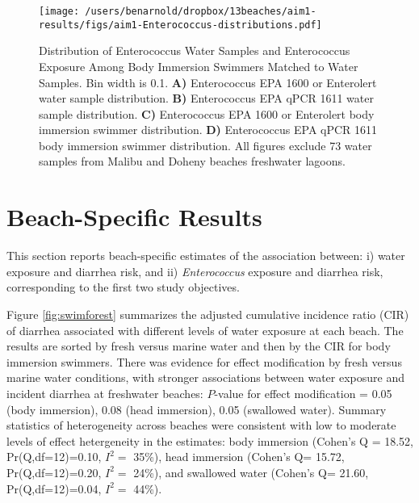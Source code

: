 \documentclass[12pt]{article}\usepackage[]{graphicx}\usepackage[]{color}
\begin{document}
\begin{figure}
\begin{center}
\texttt{[image: /users/benarnold/dropbox/13beaches/aim1-results/figs/aim1-Enterococcus-distributions.pdf]}
\caption{Distribution of Enterococcus Water Samples and Enterococcus Exposure Among Body Immersion Swimmers Matched to Water Samples. Bin width is 0.1.  \textbf{A)} Enterococcus EPA 1600 or Enterolert water sample distribution. \textbf{B)} Enterococcus EPA qPCR 1611 water sample distribution. \textbf{C)} Enterococcus EPA 1600 or Enterolert body immersion swimmer distribution. \textbf{D)} Enterococcus EPA qPCR 1611 body immersion swimmer distribution.  All figures exclude 73 water samples from Malibu and Doheny beaches freshwater lagoons.
\label{fig:enterodist}}
\end{center}
\end{figure}



\clearpage
\section{Beach-Specific Results}



This section reports beach-specific estimates of the association between: i) water exposure and diarrhea risk, and ii) \emph{Enterococcus} exposure and diarrhea risk, corresponding to the first two study objectives.

Figure \ref{fig:swimforest} summarizes the adjusted cumulative incidence ratio (CIR) of diarrhea associated with different levels of water exposure at each beach.  The results are sorted by fresh versus marine water and then by the CIR for body immersion swimmers. There was evidence for effect modification by fresh versus marine water conditions, with stronger associations between water exposure and incident diarrhea at freshwater beaches: $P$-value for effect modification = 0.05 (body immersion), 0.08 (head immersion), 0.05 (swallowed water). Summary statistics of heterogeneity across beaches\supercite{Higgins2002-vr, Higgins2003-bh} were consistent with low to moderate levels of effect hetergeneity in the estimates: body immersion (Cohen's Q =
18.52, 
Pr(Q,df=12)=0.10,
$I^2=$ 35\%),
 head immersion (Cohen's Q=
 15.72, 
Pr(Q,df=12)=0.20,
$I^2=$ 24\%),
 and swallowed water (Cohen's Q=
 21.60, 
Pr(Q,df=12)=0.04,
$I^2=$ 44\%).
\end{document}
